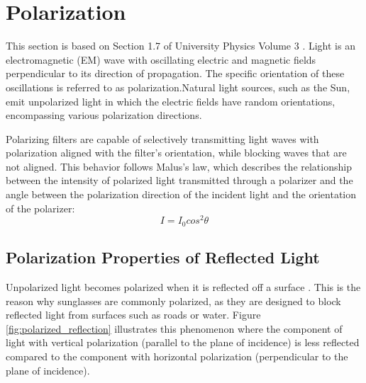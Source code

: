 \section{Polarization}
This section is based on Section 1.7 of University Physics Volume 3 \cite[30-33]{lingUniversityPhysicsVolume2016}.
Light is an electromagnetic (EM) wave with oscillating electric and magnetic fields perpendicular to its direction of propagation.
The specific orientation of these oscillations is referred to as polarization.Natural light sources, such as the Sun, emit unpolarized light in which the electric fields have random orientations, encompassing various polarization directions.


Polarizing filters are capable of selectively transmitting light waves with polarization aligned with the filter's orientation, while blocking waves that are not aligned.
This behavior follows Malus's law, which describes the relationship between the intensity of polarized light transmitted through a polarizer and the angle between the polarization direction of the incident light and the orientation of the polarizer:
\begin{equation}
    I = I_0 cos^2 \theta
\end{equation}

\subsection{Polarization Properties of Reflected Light}
Unpolarized light becomes polarized when it is reflected off a surface \cite[34]{lingUniversityPhysicsVolume2016}.
This is the reason why sunglasses are commonly polarized, as they are designed to block reflected light from surfaces such as roads or water.
Figure \ref{fig:polarized_reflection} illustrates this phenomenon where the component of light with vertical polarization (parallel to the plane of incidence) is less reflected compared to the component with horizontal polarization (perpendicular to the plane of incidence).

